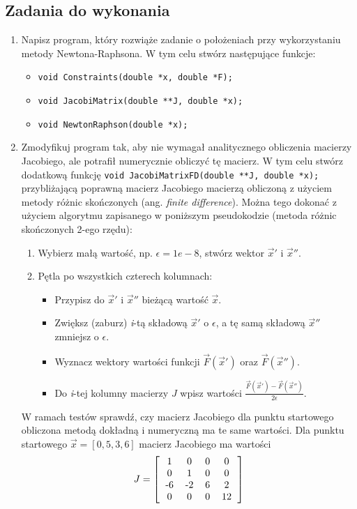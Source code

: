 \documentclass{instrukcja}
\begin{document}
\subsection*{Zadania do wykonania}
\begin{enumerate}
\item Napisz program, który rozwiąże zadanie o położeniach przy wykorzystaniu metody Newtona-Raphsona. W tym celu stwórz następujące funkcje:
\begin{itemize}
\item {\tt void Constraints(double *x, double *F);}
\item {\tt void JacobiMatrix(double **J, double *x);}
\item {\tt void NewtonRaphson(double *x);}
\end{itemize}
\item Zmodyfikuj program tak, aby nie wymagał analitycznego obliczenia macierzy Jacobiego, ale potrafił numerycznie obliczyć tę macierz. W tym celu stwórz dodatkową funkcję {\tt void JacobiMatrixFD(double **J, double *x);} przybliżającą poprawną macierz Jacobiego macierzą obliczoną z użyciem metody różnic skończonych (ang. {\it finite difference}). Można tego dokonać z użyciem algorytmu zapisanego w poniższym pseudokodzie (metoda różnic skończonych 2-ego rzędu):

\begin{enumerate}
\item Wybierz małą wartość, np. $\epsilon = 1e-8$, stwórz wektor $\vec x'$ i $\vec x''$.
\item Pętla po wszystkich czterech kolumnach:
\begin{itemize}
\item Przypisz do $\vec x'$ i $\vec x''$ bieżącą wartość $\vec x$.
\item Zwiększ (zaburz) {\it i}-tą składową $\vec x'$ o $\epsilon$, a tę samą składową $\vec x''$ zmniejsz o $\epsilon$.
\item Wyznacz wektory wartości funkcji $\vec F (\vec x')$ oraz $\vec F (\vec x'')$.
\item Do {\it i}-tej kolumny macierzy $J$ wpisz wartości $\frac{\vec F (\vec x') - \vec F (\vec x'')}{2\epsilon}$.
\end{itemize}
\end{enumerate}

W ramach testów sprawdź, czy macierz Jacobiego dla punktu startowego obliczona metodą dokładną i numeryczną ma te same wartości. Dla punktu startowego $\vec x = [0, 5, 3, 6]$ macierz Jacobiego ma wartości
\begin{displaymath}
J = \left[ \begin{tabular}{c c c c}
1 & 0 & 0 & 0 \\
0 & 1 & 0 & 0 \\
-6 & -2 & 6 &2 \\
0 & 0 & 0 & 12 \\ \end{tabular} \right]
\end{displaymath}
\end{enumerate}
\end{document}
